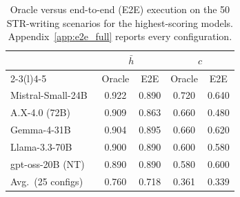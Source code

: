 \begin{table}[t]
\centering
\footnotesize

\caption{Oracle versus end-to-end (E2E) execution on the 50 STR-writing scenarios for the highest-scoring models. Appendix~\ref{app:e2e_full} reports every configuration.}
\label{tab:e2e-subset}

\begin{tabular}{@{}lcccc@{}}
\toprule
 & \multicolumn{2}{c}{$\bar{h}$} & \multicolumn{2}{c}{$c$} \\
\cmidrule(lr){2-3}\cmidrule(l){4-5}
\multicolumn{1}{c}{\textbf{Model}} & Oracle & E2E & Oracle & E2E \\
\midrule
Mistral-Small-24B~\cite{mistral2025small} & 0.922 & 0.890 & 0.720 & 0.640 \\
A.X-4.0 (72B) & 0.909 & 0.863 & 0.660 & 0.480 \\
Gemma-4-31B & 0.904 & 0.895 & 0.660 & 0.620 \\
Llama-3.3-70B~\cite{grattafiori2024llama3} & 0.900 & 0.890 & 0.600 & 0.580 \\
gpt-oss-20B (NT)~\cite{openai2025gptoss} & 0.890 & 0.890 & 0.580 & 0.600 \\
\midrule
Avg.\ (25 configs) & 0.760 & 0.718 & 0.361 & 0.339 \\
\bottomrule
\end{tabular}

\end{table}
